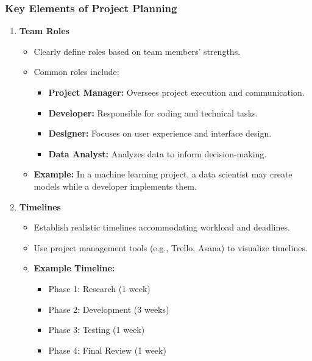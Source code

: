 \documentclass[aspectratio=169]{beamer}
\begin{document}
\begin{frame}[fragile]
    \frametitle{Key Elements of Project Planning}
    \begin{enumerate}
        \item \textbf{Team Roles}
        \begin{itemize}
            \item Clearly define roles based on team members' strengths.
            \item Common roles include:
            \begin{itemize}
                \item \textbf{Project Manager:} Oversees project execution and communication.
                \item \textbf{Developer:} Responsible for coding and technical tasks.
                \item \textbf{Designer:} Focuses on user experience and interface design.
                \item \textbf{Data Analyst:} Analyzes data to inform decision-making.
            \end{itemize}
            \item \textbf{Example:} In a machine learning project, a data scientist may create models while a developer implements them.
        \end{itemize}

        \item \textbf{Timelines}
        \begin{itemize}
            \item Establish realistic timelines accommodating workload and deadlines.
            \item Use project management tools (e.g., Trello, Asana) to visualize timelines.
            \item \textbf{Example Timeline:}
            \begin{itemize}
                \item Phase 1: Research (1 week)
                \item Phase 2: Development (3 weeks)
                \item Phase 3: Testing (1 week)
                \item Phase 4: Final Review (1 week)
            \end{itemize}
        \end{itemize}


\end{enumerate}
\end{frame}
\end{document}
